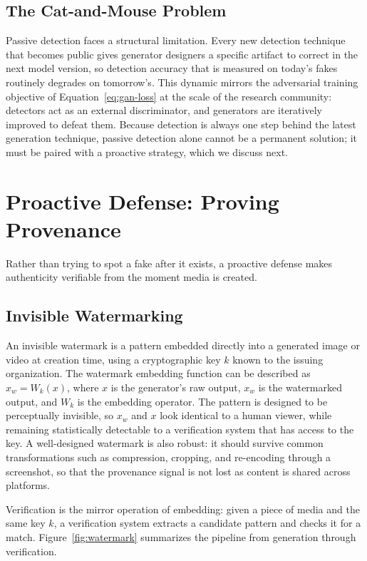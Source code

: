 \documentclass[a4paper,12pt]{article}
\begin{document}
\subsection{The Cat-and-Mouse Problem}
\label{subsec:cat-mouse}

Passive detection faces a structural limitation. Every new detection technique that becomes public gives generator designers a specific artifact to correct in the next model version, so detection accuracy that is measured on today's fakes routinely degrades on tomorrow's. This dynamic mirrors the adversarial training objective of Equation~\ref{eq:gan-loss} at the scale of the research community: detectors act as an external discriminator, and generators are iteratively improved to defeat them. Because detection is always one step behind the latest generation technique, passive detection alone cannot be a permanent solution; it must be paired with a proactive strategy, which we discuss next.


\section{Proactive Defense: Proving Provenance}
\label{sec:defense}

Rather than trying to spot a fake after it exists, a proactive defense makes authenticity verifiable from the moment media is created.

\subsection{Invisible Watermarking}
\label{subsec:watermark}

An invisible watermark is a pattern embedded directly into a generated image or video at creation time, using a cryptographic key $k$ known to the issuing organization. The watermark embedding function can be described as $x_w = W_k(x)$, where $x$ is the generator's raw output, $x_w$ is the watermarked output, and $W_k$ is the embedding operator. The pattern is designed to be perceptually invisible, so $x_w$ and $x$ look identical to a human viewer, while remaining statistically detectable to a verification system that has access to the key. A well-designed watermark is also robust: it should survive common transformations such as compression, cropping, and re-encoding through a screenshot, so that the provenance signal is not lost as content is shared across platforms.

Verification is the mirror operation of embedding: given a piece of media and the same key $k$, a verification system extracts a candidate pattern and checks it for a match. Figure~\ref{fig:watermark} summarizes the pipeline from generation through verification.
\end{document}
